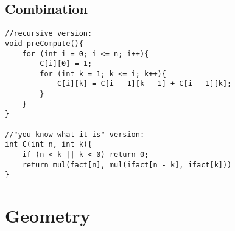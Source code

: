 \documentclass[11pt,a4paper]{article}
\begin{document}
\begin{multicols*}{2}
\subsection{Combination}
\begin{lstlisting}
//recursive version:
void preCompute(){
    for (int i = 0; i <= n; i++){
        C[i][0] = 1;
        for (int k = 1; k <= i; k++){
            C[i][k] = C[i - 1][k - 1] + C[i - 1][k];
        }
    }
}

//"you know what it is" version:
int C(int n, int k){
    if (n < k || k < 0) return 0;
    return mul(fact[n], mul(ifact[n - k], ifact[k])) 
}
\end{lstlisting}


\section{Geometry}
\

\end{multicols*}
\end{document}
